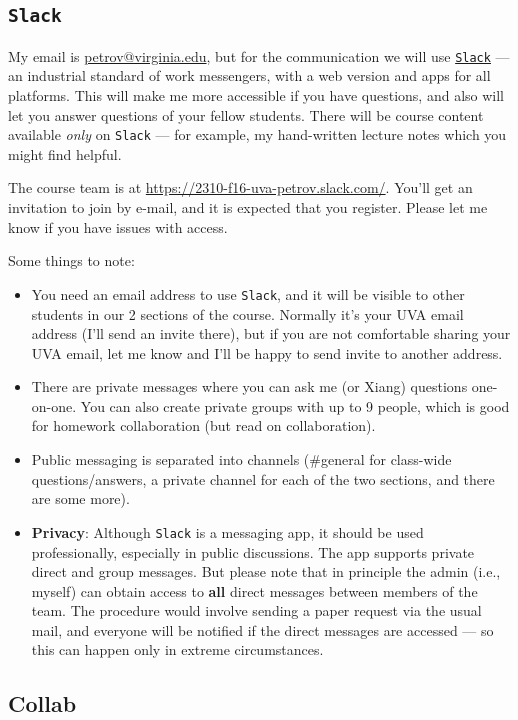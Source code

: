 \documentclass[oneside,11pt]{amsart}
\begin{document}
\subsection{\texttt{Slack}}

My email is \href{mailto:petrov@virginia.edu}{petrov@virginia.edu}, but for the communication we will use \href{https://slack.com}{\texttt{Slack}} --- an industrial standard of work messengers, with a web version and apps for all platforms. This will make me more accessible if you have questions, and also will let you answer questions of your fellow students. There will be course content available \emph{only} on \texttt{Slack} --- for example, my hand-written lecture notes which you might find helpful.

The course team is at \url{https://2310-f16-uva-petrov.slack.com/}. You'll get an invitation to join by e-mail, and it is expected that you register. Please let me know if you have issues with access. 

Some things to note:
\begin{itemize}
	\item You need an email address to use \texttt{Slack}, and it will be visible to other students in our 2 sections of the course. Normally it's your UVA email address (I'll send an invite there), but if you are not comfortable sharing your UVA email, let me know and I'll be happy to send invite to another address.
	\item There are private messages where you can ask me (or Xiang) questions one-on-one. You can also create private groups with up to 9 people, which is good for homework collaboration (but read  on collaboration).
	\item Public messaging is separated into channels (\#general for class-wide questions/answers, a private channel for each of the two sections, and there are some more).
	\item \textbf{Privacy}: Although \texttt{Slack} is a messaging app, it should be used professionally, especially in public discussions. The app supports private direct and group messages. But please note that in principle the admin (i.e., myself) can obtain access to \textbf{all} direct messages between members of the team. The procedure would involve sending a paper request via the usual mail, and everyone will be notified if the direct messages are accessed --- so this can happen only in extreme circumstances.
\end{itemize}

\subsection{Collab}
\end{document}
